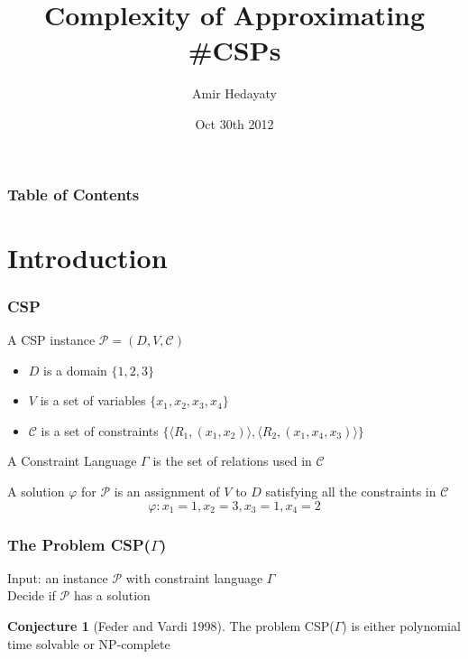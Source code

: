 \documentclass[a4paper,handout]{beamer}
\author{Amir Hedayaty}
\title{Complexity of Approximating \#CSPs}
\institute{Simon Fraser University}
\date{Oct 30th 2012}
\theoremstyle{definition}
\newtheorem{conj}{Conjecture}
\begin{document}
\begin{frame}
\titlepage
\end{frame}

\begin{frame}
\frametitle{Table of Contents}
\tableofcontents
\end{frame}

\section{Introduction}

\begin{frame}
\frametitle{CSP}
A CSP instance \(\mathcal{P} = (D, V, \mathcal{C})\)
\begin{itemize}
\item \(D\) is a domain  {\(\{1,2,3\}\)}
\item \(V\) is a set of variables  {\(\{x_1,x_2,x_3,x_4\}\)}
\item \(\mathcal{C}\) is a set of constraints  {\(\{\langle R_1, (x_1,x_2)\rangle, \langle R_2, (x_1, x_4, x_3)\rangle\} \)}
\end{itemize}
\pause %
\pause
A Constraint Language \(\Gamma\) is the set of relations used in \(\mathcal{C}\)
\vspace{1.2cm}

\pause
A solution \(\varphi\) for \(\mathcal{P}\) is an assignment of \(V\) to \(D\) satisfying all the constraints in \(\mathcal{C}\)
\pause
\[\varphi: x_1=1, x_2=3, x_3=1, x_4=2\]
\end{frame}

\begin{frame}
\frametitle{The Problem CSP(\(\Gamma\))}
\begin{definition} 
Input: an instance \(\mathcal{P}\) with constraint language \(\Gamma\) \\
Decide if \(\mathcal{P}\) has a solution
\end{definition}
\begin{conj} [Feder and Vardi 1998]
The problem CSP(\(\Gamma\)) is either polynomial time solvable or NP-complete
\end{conj}
\end{frame}
\end{document}
